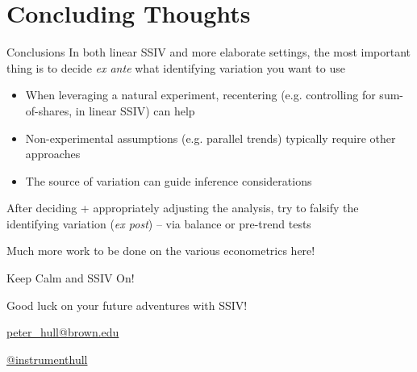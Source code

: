 \documentclass{beamer}
\begin{document}
\section{Concluding Thoughts}
\begin{frame}{Conclusions}
In both linear SSIV and more elaborate settings, the most important thing is to decide \emph{ex ante} what identifying variation you want to use\smallskip\pause{}
\begin{itemize}
\item When leveraging a natural experiment, recentering (e.g. controlling for sum-of-shares, in linear SSIV) can help\smallskip\pause{}
\item Non-experimental assumptions (e.g. parallel trends) typically require other approaches \smallskip
\item The source of variation can guide inference considerations
\end{itemize}\medskip\pause{}

After deciding + appropriately adjusting the analysis, try to falsify the identifying variation (\emph{ex post}) -- via balance or pre-trend tests\bigskip\pause{}

Much more work to be done on the various econometrics here!
\end{frame}


\begin{frame}{Keep Calm and SSIV On!}

\begin{center}
Good luck on your future adventures with SSIV!

\bigskip
\url{peter_hull@brown.edu}

\bigskip
 \url{@instrumenthull}
\end{center}
\end{frame}
\end{document}
